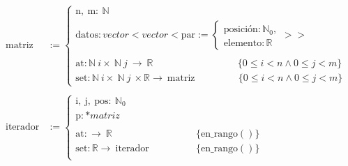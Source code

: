 \begin{align}
    \text{matriz}   &:=  \left\{ 
                            \begin{array}{lcc}
                                \text{n},\ \text{m}:\ \mathbb{N} \\
                                \text{datos}: vector<vector< \text{par} := \left\{
                                                                                \begin{array}{lcc}    
                                                                                    \text{posición}: \mathbb{N}_0, \\
                                                                                    \text{elemento}: \mathbb{R}
                                                                                \end{array}
                                                                            \right. >> \\
                                \\
                                \text{at}: \mathbb{N}\ i \times\ \mathbb{N}\ j\ \longrightarrow\ \mathbb{R} 
                                    \ \ \ \qquad \qquad \qquad \qquad \{0 \leq i < n \wedge 0 \leq j < m\}\\
                                \text{set}: \mathbb{N}\ i \times\ \mathbb{N}\ j\ \times \mathbb{R} \longrightarrow\ \text{matriz} 
                                    \ \ \qquad \qquad \{0 \leq i < n \wedge 0 \leq j < m\}
                            \end{array}
                        \right.\
\\ \nonumber
\\
    \text{iterador}   &:=    \left\{ 
                                \begin{array}{lcc}
                                    \text{i},\ \text{j},\ \text{pos}:\ \mathbb{N}_0 \\
                                    \text{p}: *matriz \\
                                    \\
                                    \text{at}: \longrightarrow\ \mathbb{R}                      
                                        & \qquad \qquad \{\text{en\_rango}()\} \\
                                    \text{set}: \mathbb{R} \longrightarrow\ \text{iterador}     
                                        & \qquad \qquad \{\text{en\_rango}()\} \\

\end{array}
\end{align}
